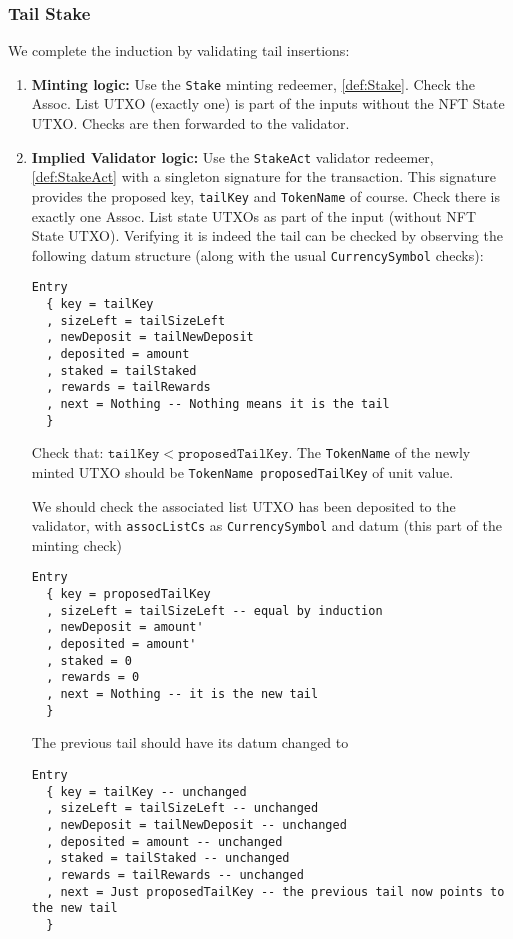 \documentclass[10pt, a4paper]{article}
\theoremstyle{definition}
\begin{document}
\subsubsection{Tail Stake}\label{subsubsection:TailStake}
We complete the induction by validating tail insertions:
\begin{enumerate}
\item{\textbf{Minting logic:} Use the \texttt{Stake} minting redeemer, \ref{def:Stake}. Check the Assoc. List UTXO (exactly one) is part of the inputs without the NFT State UTXO. Checks are then forwarded to the validator.
}

\item{\textbf{Implied Validator logic:} Use the \texttt{StakeAct} validator redeemer, \ref{def:StakeAct} with a singleton signature for the transaction. This signature provides the proposed key, \texttt{tailKey} and \texttt{TokenName} of course. Check there is exactly one Assoc. List state UTXOs as part of the input (without NFT State UTXO). Verifying it is indeed the tail can be checked by observing the following datum structure (along with the usual \texttt{CurrencySymbol} checks):
\begin{verbatim}
Entry
  { key = tailKey
  , sizeLeft = tailSizeLeft
  , newDeposit = tailNewDeposit
  , deposited = amount
  , staked = tailStaked 
  , rewards = tailRewards 
  , next = Nothing -- Nothing means it is the tail
  }
\end{verbatim}

Check that: $\texttt{tailKey} < \texttt{proposedTailKey}.$ The \texttt{TokenName} of the newly minted UTXO should be \texttt{TokenName proposedTailKey} of unit value.

 We should check the associated list UTXO has been deposited to the validator, with \texttt{assocListCs} as \texttt{CurrencySymbol} and datum (this part of the minting check)
\begin{verbatim}
Entry
  { key = proposedTailKey
  , sizeLeft = tailSizeLeft -- equal by induction
  , newDeposit = amount'
  , deposited = amount'
  , staked = 0 
  , rewards = 0
  , next = Nothing -- it is the new tail
  }
\end{verbatim}

The previous tail should have its datum changed to \begin{verbatim}
Entry
  { key = tailKey -- unchanged
  , sizeLeft = tailSizeLeft -- unchanged
  , newDeposit = tailNewDeposit -- unchanged
  , deposited = amount -- unchanged
  , staked = tailStaked -- unchanged
  , rewards = tailRewards -- unchanged
  , next = Just proposedTailKey -- the previous tail now points to the new tail
  }
\end{verbatim}

}
\end{enumerate}
\end{document}

